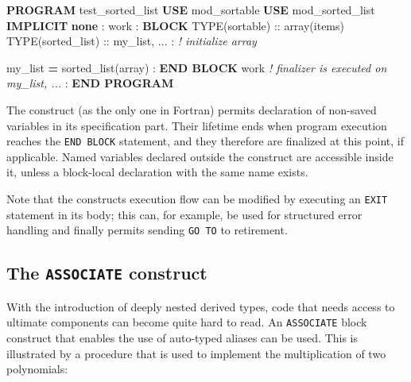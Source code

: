 \documentclass[
]{scrartcl}
\newenvironment{Shaded}{}{}
\newcommand{\CommentTok}[1]{\textcolor[rgb]{0.38,0.63,0.69}{\textit{#1}}}
\newcommand{\DataTypeTok}[1]{\textcolor[rgb]{0.56,0.13,0.00}{#1}}
\newcommand{\KeywordTok}[1]{\textcolor[rgb]{0.00,0.44,0.13}{\textbf{#1}}}
\newcommand{\NormalTok}[1]{#1}
\begin{document}
\begin{Shaded}
\begin{Highlighting}[]
\KeywordTok{PROGRAM}\NormalTok{ test\_sorted\_list}
   \KeywordTok{USE}\NormalTok{ mod\_sortable}
   \KeywordTok{USE}\NormalTok{ mod\_sorted\_list}
   \KeywordTok{IMPLICIT} \KeywordTok{none}
\NormalTok{   :}
\NormalTok{   work : }\KeywordTok{BLOCK}
      \DataTypeTok{TYPE(sortable)} \DataTypeTok{::}\NormalTok{ array(items)}
      \DataTypeTok{TYPE(sorted\_list)} \DataTypeTok{::}\NormalTok{ my\_list, ...}
\NormalTok{      : }\CommentTok{! initialize array}

\NormalTok{      my\_list }\KeywordTok{=}\NormalTok{ sorted\_list(array)}
\NormalTok{      :}
   \KeywordTok{END BLOCK}\NormalTok{ work  }\CommentTok{! finalizer is executed on my\_list, ...}
\NormalTok{   :}
\KeywordTok{END PROGRAM}
\end{Highlighting}
\end{Shaded}

The construct (as the only one in Fortran) permits declaration of
non-saved variables in its specification part. Their lifetime ends when
program execution reaches the \texttt{END\ BLOCK} statement, and they
therefore are finalized at this point, if applicable. Named variables
declared outside the construct are accessible inside it, unless a
block-local declaration with the same name exists.

Note that the construct\textquotesingle s execution flow can be modified
by executing an \texttt{EXIT} statement in its body; this can, for
example, be used for structured error handling and finally permits
sending \texttt{GO\ TO} to retirement.

\subsection{\texorpdfstring{The \texttt{ASSOCIATE}
construct}{The ASSOCIATE construct}}\label{the-associate-construct}

With the introduction of deeply nested derived types, code that needs
access to ultimate components can become quite hard to read. An
\texttt{ASSOCIATE} block construct that enables the use of auto-typed
aliases can be used. This is illustrated by a procedure that is used to
implement the multiplication of two polynomials:
\end{document}
